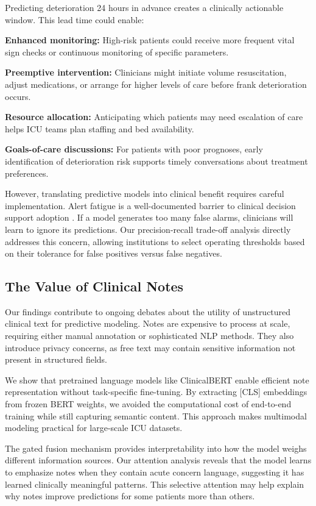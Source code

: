 Predicting deterioration 24 hours in advance creates a clinically actionable window. This lead time could enable:

\textbf{Enhanced monitoring:} High-risk patients could receive more frequent vital sign checks or continuous monitoring of specific parameters.

\textbf{Preemptive intervention:} Clinicians might initiate volume resuscitation, adjust medications, or arrange for higher levels of care before frank deterioration occurs.

\textbf{Resource allocation:} Anticipating which patients may need escalation of care helps ICU teams plan staffing and bed availability.

\textbf{Goals-of-care discussions:} For patients with poor prognoses, early identification of deterioration risk supports timely conversations about treatment preferences.

However, translating predictive models into clinical benefit requires careful implementation. Alert fatigue is a well-documented barrier to clinical decision support adoption \citep{Ancker2017}. If a model generates too many false alarms, clinicians will learn to ignore its predictions. Our precision-recall trade-off analysis directly addresses this concern, allowing institutions to select operating thresholds based on their tolerance for false positives versus false negatives.

\subsection{The Value of Clinical Notes}

Our findings contribute to ongoing debates about the utility of unstructured clinical text for predictive modeling. Notes are expensive to process at scale, requiring either manual annotation or sophisticated NLP methods. They also introduce privacy concerns, as free text may contain sensitive information not present in structured fields.

We show that pretrained language models like ClinicalBERT enable efficient note representation without task-specific fine-tuning. By extracting [CLS] embeddings from frozen BERT weights, we avoided the computational cost of end-to-end training while still capturing semantic content. This approach makes multimodal modeling practical for large-scale ICU datasets.

The gated fusion mechanism provides interpretability into how the model weighs different information sources. Our attention analysis reveals that the model learns to emphasize notes when they contain acute concern language, suggesting it has learned clinically meaningful patterns. This selective attention may help explain why notes improve predictions for some patients more than others.

